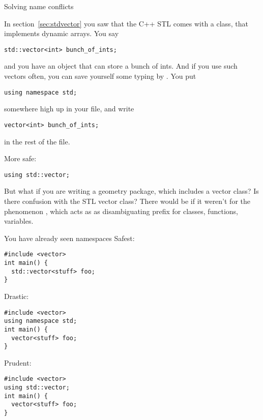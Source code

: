 
 {Solving name conflicts}
\label{sec:usename}

In section~\ref{sec:stdvector} you saw that the C++ \ac{STL} comes with
a  class, that implements dynamic arrays. You say
\begin{lstlisting}
std::vector<int> bunch_of_ints;
\end{lstlisting}
and you have an object that can store a bunch of ints. And if you use
such vectors often, you can save yourself some typing by 
.
You put
\begin{lstlisting}
using namespace std;
\end{lstlisting}
somewhere high up in your file, and write
\begin{lstlisting}
vector<int> bunch_of_ints;
\end{lstlisting}
in the rest of the file.

More safe:
\begin{lstlisting}
using std::vector;
\end{lstlisting}

But what if you are writing a geometry package, which includes a
vector class? Is there confusion with the \ac{STL} vector class?
There would be if it weren't for the phenomenon
, which acts as as disambiguating prefix for
classes, functions, variables.

\begin{slide}{You have already seen namespaces}
  \label{sl:vec-namespace}
  Safest:
\begin{lstlisting}
#include <vector>
int main() {
  std::vector<stuff> foo;
}
\end{lstlisting}
\begin{multicols}{2}
  Drastic:
\begin{lstlisting}
#include <vector>
using namespace std;
int main() {
  vector<stuff> foo;
}
\end{lstlisting}
\vfill\columnbreak
Prudent:
\begin{lstlisting}
#include <vector>
using std::vector;
int main() {
  vector<stuff> foo;
}
\end{lstlisting}
\end{multicols}
\end{slide}

